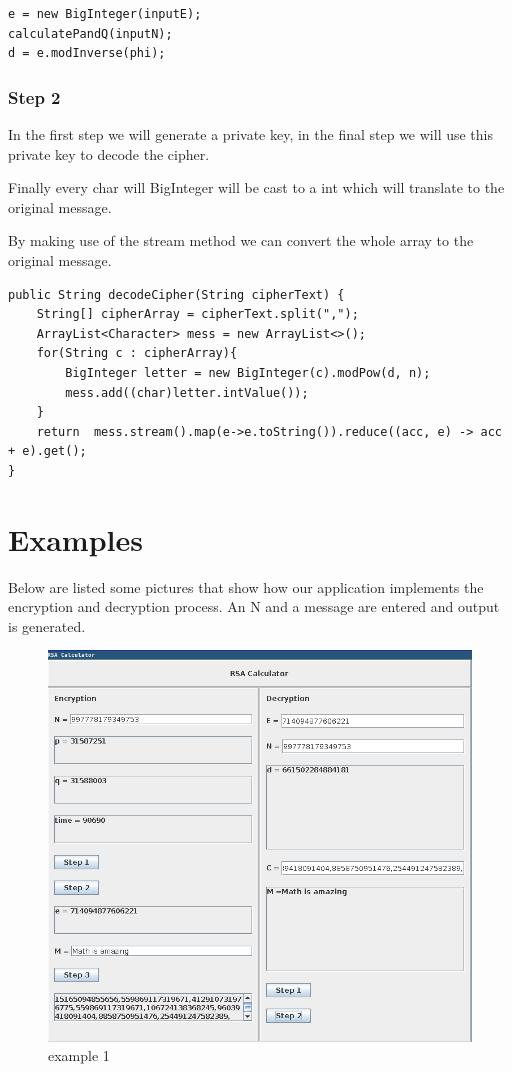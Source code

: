 \begin{lstlisting}
e = new BigInteger(inputE);
calculatePandQ(inputN);
d = e.modInverse(phi);
\end{lstlisting}{}

\subsubsection{Step 2}
In the first step we will generate a private key, in the final step we will use this private key to decode the cipher.

Finally every char will BigInteger will be cast to a int which will translate to
the original message.

By making use of the stream method we can convert the whole array to the original message.

\begin{lstlisting}
public String decodeCipher(String cipherText) {
    String[] cipherArray = cipherText.split(",");
    ArrayList<Character> mess = new ArrayList<>();
    for(String c : cipherArray){
        BigInteger letter = new BigInteger(c).modPow(d, n);
        mess.add((char)letter.intValue());
    }
    return  mess.stream().map(e->e.toString()).reduce((acc, e) -> acc  + e).get();
}
\end{lstlisting}
\newpage

\section{Examples}
Below are listed some pictures that show how our
application implements the encryption and decryption
process. An N and a message are entered and output
is generated.
\begin{figure}[h]
    \includegraphics[width=\linewidth]{images/example_1}
    \caption{example 1}
    \label{fig:boat1}
\end{figure}

